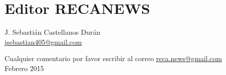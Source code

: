 \documentclass{book}
\begin{document}
			\section*{Editor RECANEWS}
  
\begin{flushright}
J. Sebastián Castellanos Durán\\
\url{jsebastian405@gmail.com}
\end{flushright}
\begin{flushright}
Cualquier comentario por favor escribir al correo  \url{reca.news@gmail.com}\\
Febrero 2015
\end{flushright}
\end{document}
